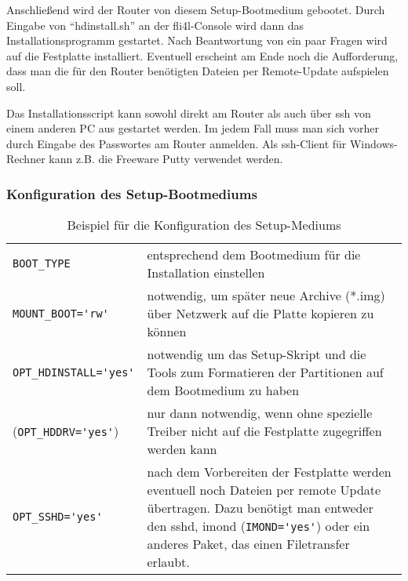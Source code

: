     Anschließend wird der Router von diesem Setup-Bootmedium gebootet.  
    Durch Eingabe von ``hdinstall.sh'' an der fli4l-Console wird dann
    das Installationsprogramm gestartet. Nach Beantwortung von ein paar Fragen 
    wird auf die Festplatte installiert. Eventuell erscheint am Ende noch die Aufforderung, 
    dass man die für den Router benötigten Dateien per Remote-Update aufspielen soll.

    
    Das Installationsscript kann sowohl direkt am Router als auch über ssh von einem
    anderen PC aus gestartet werden. Im jedem Fall muss man sich vorher 
    durch Eingabe des Passwortes am Router anmelden. Als ssh-Client für Windows-Rechner
    kann z.B. die Freeware Putty verwendet werden.


\subsubsection{Konfiguration des Setup-Bootmediums}

\begin{table}[htb]
  \begin{center}
    \begin{small}
    \begin{tabular}[h!]{lp{9cm}}
    \verb*?BOOT_TYPE? & entsprechend dem Bootmedium für die Installation einstellen\\
    \verb*?MOUNT_BOOT='rw'? & notwendig, um später neue Archive (*.img) über Netzwerk
        auf die Platte kopieren zu können\\
    \verb*?OPT_HDINSTALL='yes'? & notwendig um das Setup-Skript und die Tools zum 
        Formatieren der Partitionen auf dem Bootmedium zu haben\\
    (\verb*?OPT_HDDRV='yes'?) & nur dann notwendig, wenn ohne spezielle Treiber nicht auf die
        Festplatte zugegriffen werden kann\\
    \verb*?OPT_SSHD='yes'? & nach dem Vorbereiten der Festplatte werden
        eventuell noch Dateien per remote Update übertragen. Dazu
        benötigt man entweder den sshd, imond (\verb*?IMOND='yes'?) oder ein
        anderes Paket, das einen Filetransfer erlaubt. 
    \end{tabular}
    \end{small}
    \caption{Beispiel für die Konfiguration des Setup-Mediums}
  \end{center}
\end{table}


